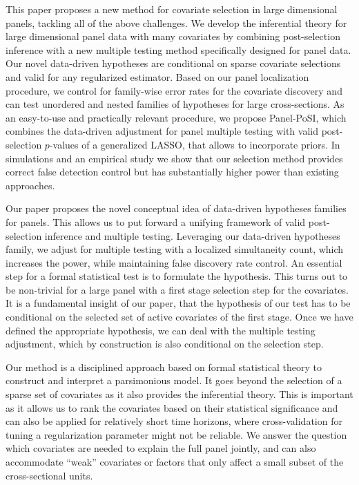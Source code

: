 \documentclass[11pt]{article}
\def\cmt#1{{\textcolor{red}{(#1)}}}
\begin{document}
	
	This paper proposes a new method for covariate selection in large dimensional panels, tackling all of the above challenges. We develop the inferential theory for large dimensional panel data with many covariates by combining post-selection inference with a new multiple testing method specifically designed for panel data. Our novel data-driven hypotheses are conditional on sparse covariate selections and valid for any regularized estimator. Based on our panel localization procedure, we control for family-wise error rates for the covariate discovery and can test unordered and nested families of hypotheses for large cross-sections. As an easy-to-use and practically relevant procedure, we propose Panel-PoSI, which combines the data-driven adjustment for panel multiple testing with valid post-selection $p$-values of a generalized LASSO, that allows to incorporate priors. In simulations and an empirical study we show that our selection method provides correct false detection control but has substantially higher power than existing approaches.
	
	Our paper proposes the novel conceptual idea of data-driven hypotheses families for panels. This allows us to put forward a unifying framework of valid post-selection inference and multiple testing. Leveraging our data-driven hypotheses family, we adjust for multiple testing with a localized simultaneity count, which increases the power, while maintaining false discovery rate control. An essential step for a formal statistical test is to formulate the hypothesis. This turns out to be non-trivial for a large panel with a first stage selection step for the covariates. It is a fundamental insight of our paper, that the hypothesis of our test has to be conditional on the selected set of active covariates of the first stage. Once we have defined the appropriate hypothesis, we can deal with the multiple testing adjustment, which by construction is also conditional on the selection step.  
	
	Our method is a disciplined approach based on formal statistical theory to construct and interpret a parsimonious model. It goes beyond the selection of a sparse set of covariates as it also provides the inferential theory. This is important as it allows us to rank the covariates based on their statistical significance and can also be applied for relatively short time horizons, where cross-validation for tuning a regularization parameter might not be reliable. We answer the question which covariates are needed to explain the full panel jointly, and can also accommodate ``weak'' covariates or factors that only affect a small subset of the cross-sectional units. %
	
\end{document}
